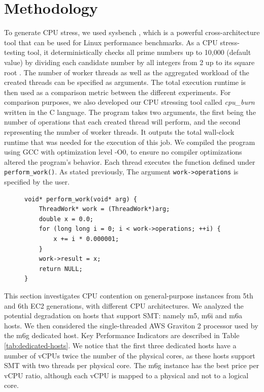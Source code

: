 \section{Methodology}
To generate CPU stress, we used sysbench \cite{sysbench}, which is a powerful cross-architecture tool
that can be used for Linux performance benchmarks. As a CPU stress-testing tool, it deterministically 
checks all prime numbers up to 10,000 (default value) by dividing each candidate number by all integers 
from 2 up to its square root \cite{gentoo_sysbench}. The number of worker threads 
as well as the aggregated workload of the created threads can be specified as arguments. 
The total execution runtime is then used as a comparison metric 
between the different experiments. For comparison purposes, we also developed our CPU stressing 
tool called \textit{cpu\_burn} written in the C language. The program takes two arguments, the first 
being the number of operations that each created thread will perform, and the second representing 
the number of worker threads. It outputs the total wall-clock runtime that was needed for the 
execution of this job. 
We compiled the program using GCC with optimization level -O0, to ensure no compiler optimizations
altered the program's behavior. Each thread executes the function defined under \texttt{perform\_work()}. 
As stated previously, The argument \texttt{work->operations} is specified by the user.

\begin{figure}[H]
\begin{lstlisting}[caption={Workload of the \textit{cpu\_burn} tool}]
void* perform_work(void* arg) {
    ThreadWork* work = (ThreadWork*)arg;
    double x = 0.0;
    for (long long i = 0; i < work->operations; ++i) {
        x += i * 0.000001;
    }
    work->result = x;
    return NULL;
}
\end{lstlisting}
\end{figure}
\noindent
This section investigates CPU contention on general-purpose instances from 5th and 6th EC2 generations, 
with different CPU architectures. We analyzed the potential degradation on hosts that support 
\acl{SMT}: namely m5, m6i and m6a hosts. We then considered the single-threaded AWS Graviton 2 
processor used by the m6g dedicated host. Key Performance Indicators are described 
in Table \ref{tab:dedicated-hosts}. We notice that the first three dedicated hosts have a number of vCPUs 
twice the number of the physical cores, as these hosts support \ac{SMT} with 
two threads per physical core. The m6g instance has the best price per vCPU ratio, although each 
vCPU is mapped to a physical and not to a logical core.

